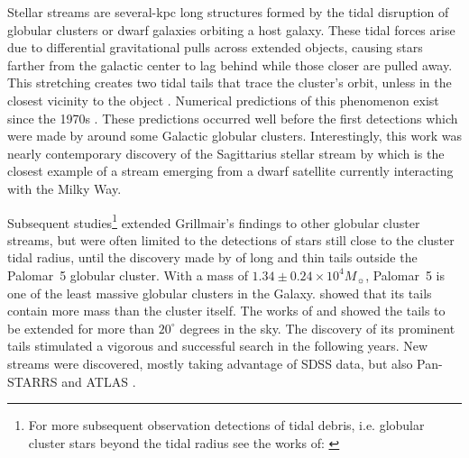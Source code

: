 \documentclass{aa}
\begin{document}
  Stellar streams are several-kpc long structures formed by the tidal disruption of globular clusters or dwarf galaxies orbiting a host galaxy. These tidal forces arise due to differential gravitational pulls across extended objects, causing stars farther from the galactic center to lag behind while those closer are pulled away. This stretching creates two tidal tails that trace the cluster's orbit, unless in the closest vicinity to the object \citep{2007ApJ...659.1212M}. Numerical predictions of this phenomenon exist since the 1970s \citep[see, for example][]{1975AJ.....80..290K}. These predictions occurred well before the first detections which were made by \citet{1995AJ....109.2553G} around some Galactic globular clusters. Interestingly, this work was nearly contemporary discovery of the Sagittarius stellar stream by \citet{1994Natur.370..194I} which is the closest example of a stream emerging from a dwarf satellite currently interacting with the Milky Way. 
  
  Subsequent studies\footnote{For more subsequent observation detections of tidal debris, i.e. globular cluster stars beyond the tidal radius see the works of: \citet{1997A&A...320..776L, 2000A&A...356..127T, 2000A&A...359..907L, 2001AAS...19910906S, 2003AJ....126..815L}} extended Grillmair's findings to other globular cluster streams, but were often limited to the detections of stars still close to the cluster tidal radius, until the discovery made by \citet{2001ApJ...548L.165O,2002AAS...200.1001O, 2003AJ....126.2385O} of long and thin tails outside the Palomar~5 globular cluster. With a mass of $1.34\pm 0.24 \times 10^4 M_{\sun}$, Palomar~5 is one of the least massive globular clusters in the Galaxy. \citet{2003AJ....126.2385O} showed that its tails contain more mass than the cluster itself. The works of \citet{2006ApJ...641L..37G} and \citet{2015MNRAS.446.3297K} showed the tails to be extended for more than $20^\circ$ degrees in the sky. The discovery of its prominent tails stimulated a vigorous and successful search in the following years. New streams were discovered, mostly taking advantage of SDSS data, but also Pan-STARRS and ATLAS  \citep{2006ApJ...643L..17G, 2006ApJ...637L..29B, 2009ApJ...693.1118G, 2012ApJ...760L...6B, 2013ApJ...769L..23G, 2014ApJ...790L..10G, 2015ApJ...812L..26G, 2014MNRAS.443L..84B, 2016MNRAS.463.1759B, 2017ApJ...847..119G, 2014MNRAS.442L..85K}. 
  
\end{document}
